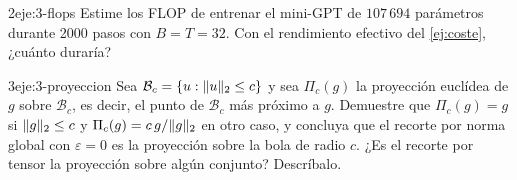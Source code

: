 \begin{ejercicio}{2}{eje:3-flops}
Estime los FLOP de entrenar el mini-GPT de $107\,694$ parámetros durante 2000 pasos con $B=T=32$. Con el rendimiento efectivo del \cref{ej:coste}, ¿cuánto duraría?
\end{ejercicio}

\begin{ejercicio}{3}{eje:3-proyeccion}
Sea $\mathcal{B}_c=\{u:\lVert u\rVert_2\le c\}$ y sea $\Pi_c(g)$ la proyección euclídea de $g$ sobre $\mathcal{B}_c$, es decir, el punto de $\mathcal{B}_c$ más próximo a $g$. Demuestre que $\Pi_c(g)=g$ si $\lVert g\rVert_2\le c$ y $\Pi_c(g)=c\,g/\lVert g\rVert_2$ en otro caso, y concluya que el recorte por norma global con $\varepsilon=0$ es la proyección sobre la bola de radio $c$. ¿Es el recorte por tensor la proyección sobre algún conjunto? Descríbalo.
\end{ejercicio}
